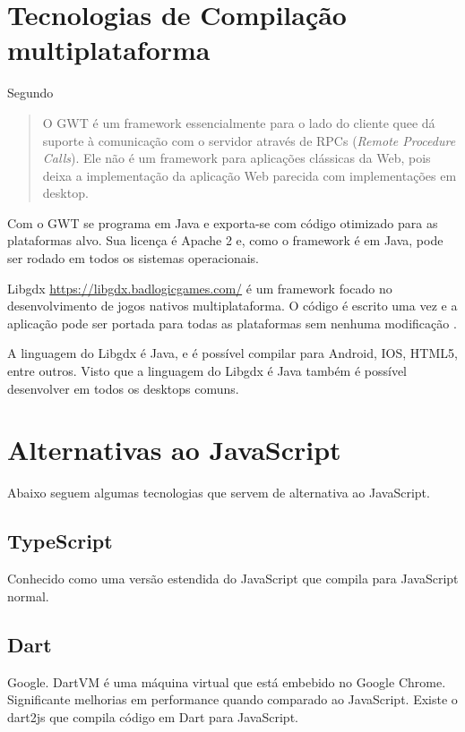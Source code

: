 \chapter{Tecnologias de Compilação multiplataforma}

Segundo \citet[p. 29]{gwt}
\begin{quote}
O GWT é um framework essencialmente para o lado do cliente quee dá
suporte à comunicação com o servidor através de RPCs (\textit{Remote
Procedure Calls}). Ele não é um framework para aplicações clássicas
da Web, pois deixa a implementação da aplicação Web parecida com
implementações em desktop.
\end{quote}

Com o GWT se programa em Java e exporta-se com código otimizado para
as plataformas alvo. Sua licença é Apache 2 e, como o framework é em Java,
pode ser rodado em todos os sistemas operacionais.

Libgdx \url{https://libgdx.badlogicgames.com/} é um framework
focado no desenvolvimento de jogos nativos multiplataforma. O
código é escrito uma vez e a aplicação pode ser portada para
todas as plataformas sem nenhuma modificação \autocite[p.
8]{crossPlatformMobileGameDevelopment}.

A linguagem do Libgdx é Java, e é possível compilar para Android,
IOS, HTML5, entre outros. Visto que a linguagem do Libgdx é Java
também é possível desenvolver em todos os desktops comuns.

\chapter{Alternativas ao JavaScript} \label{jsAlternatives}

Abaixo seguem algumas tecnologias que servem de alternativa ao
JavaScript.

\section{TypeScript}

Conhecido como uma versão estendida do JavaScript que compila para
JavaScript normal.

\section{Dart}

Google. DartVM é uma máquina virtual que está embebido no Google
Chrome. Significante melhorias em performance quando comparado
ao JavaScript. Existe o dart2js que compila código em Dart para
JavaScript.


